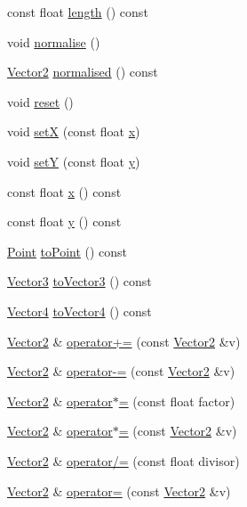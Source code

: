 \begin{DoxyCompactItemize}
const float \hyperlink{classprism_1_1_vector2_ab4141940a37d76a815b7c9b01dad93b6}{length} () const 
\item 
void \hyperlink{classprism_1_1_vector2_a828a5663c78de16fcc714f5604d0668b}{normalise} ()
\item 
\hyperlink{classprism_1_1_vector2}{Vector2} \hyperlink{classprism_1_1_vector2_a0e2e103ba688416d6343f41160484db3}{normalised} () const 
\item 
void \hyperlink{classprism_1_1_vector2_a5f4b534cf2e84711acb8028f388c8356}{reset} ()
\item 
void \hyperlink{classprism_1_1_vector2_a2f1a3d79e5f0867e60559dc0ea63b8d4}{setX} (const float \hyperlink{classprism_1_1_vector2_a03a3e6c084d4fda83cc688d22ffcf5bb}{x})
\item 
void \hyperlink{classprism_1_1_vector2_a87e9c4ae531f0f891091fe0241e54bb7}{setY} (const float \hyperlink{classprism_1_1_vector2_a6656aa95639282560722da4b5da76423}{y})
\item 
const float \hyperlink{classprism_1_1_vector2_a03a3e6c084d4fda83cc688d22ffcf5bb}{x} () const 
\item 
const float \hyperlink{classprism_1_1_vector2_a6656aa95639282560722da4b5da76423}{y} () const 
\item 
\hyperlink{classprism_1_1_point}{Point} \hyperlink{classprism_1_1_vector2_a8865c6f53a7d20f078db0105f9eedcf1}{to\+Point} () const 
\item 
\hyperlink{classprism_1_1_vector3}{Vector3} \hyperlink{classprism_1_1_vector2_aa48bc310947baa86b092a72dad20a302}{to\+Vector3} () const 
\item 
\hyperlink{classprism_1_1_vector4}{Vector4} \hyperlink{classprism_1_1_vector2_ad3c9cf0b36f92f8afd6a9f702122c1d8}{to\+Vector4} () const 
\item 
\hyperlink{classprism_1_1_vector2}{Vector2} \& \hyperlink{classprism_1_1_vector2_a2f800680121b56af5a3cf5b2f1b58b4d}{operator+=} (const \hyperlink{classprism_1_1_vector2}{Vector2} \&v)
\item 
\hyperlink{classprism_1_1_vector2}{Vector2} \& \hyperlink{classprism_1_1_vector2_afb5b1b3ddf0d527b2cca5cdeb73b88c5}{operator-\/=} (const \hyperlink{classprism_1_1_vector2}{Vector2} \&v)
\item 
\hyperlink{classprism_1_1_vector2}{Vector2} \& \hyperlink{classprism_1_1_vector2_ad2fcf8cedcba624066c20d77689a8447}{operator$\ast$=} (const float factor)
\item 
\hyperlink{classprism_1_1_vector2}{Vector2} \& \hyperlink{classprism_1_1_vector2_a25e400c207412357eb2c0b54dca4587d}{operator$\ast$=} (const \hyperlink{classprism_1_1_vector2}{Vector2} \&v)
\item 
\hyperlink{classprism_1_1_vector2}{Vector2} \& \hyperlink{classprism_1_1_vector2_adf83881cb40c5bc759be686c56642049}{operator/=} (const float divisor)
\item 
\hyperlink{classprism_1_1_vector2}{Vector2} \& \hyperlink{classprism_1_1_vector2_af39ae453cf969911b1761dc438198e10}{operator=} (const \hyperlink{classprism_1_1_vector2}{Vector2} \&v)
\end{DoxyCompactItemize}
